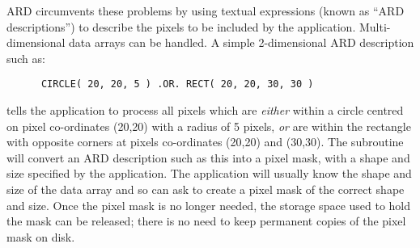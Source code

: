 ARD circumvents these problems by using textual expressions (known as ``ARD
descriptions'') to describe the pixels to be included by the application.
Multi-dimensional data arrays can be handled. A simple 2-dimensional ARD
description such as: 

\small
\begin{verbatim}
      CIRCLE( 20, 20, 5 ) .OR. RECT( 20, 20, 30, 30 ) 
\end{verbatim}
\normalsize

tells the application to process all pixels which are {\em either} within a
circle centred on pixel co-ordinates (20,20) with a radius of 5 pixels, 
{\em or} are within the rectangle with opposite corners at pixels co-ordinates 
(20,20) and (30,30). The 
subroutine will convert an ARD description such as this into a pixel mask, with
a shape and size specified by the application. The application will usually know
the shape and size of the data array and so can ask  to create a pixel
mask of the correct shape and size. Once the pixel mask is no longer needed,
the storage space used to hold the mask can be released; there is no need to
keep permanent copies of the pixel mask on disk. 

